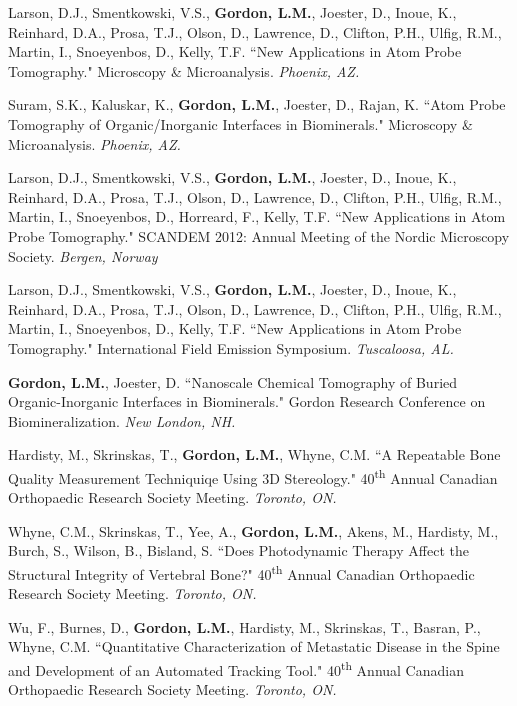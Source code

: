 Larson, D.J., Smentkowski, V.S., \textbf{Gordon, L.M.}, Joester, D., Inoue, K.,  Reinhard, D.A., Prosa, T.J., Olson, D., Lawrence, D., Clifton, P.H., Ulfig, R.M., Martin, I., Snoeyenbos, D., Kelly, T.F. ``New Applications in Atom Probe Tomography." Microscopy \& Microanalysis. \emph{Phoenix, AZ.}

Suram, S.K., Kaluskar, K., \textbf{Gordon, L.M.}, Joester, D., Rajan, K. ``Atom Probe Tomography of Organic/Inorganic Interfaces in Biominerals." Microscopy \& Microanalysis. \emph{Phoenix, AZ.}

Larson, D.J., Smentkowski, V.S., \textbf{Gordon, L.M.}, Joester, D., Inoue, K.,  Reinhard, D.A., Prosa, T.J., Olson, D., Lawrence, D., Clifton, P.H., Ulfig, R.M., Martin, I., Snoeyenbos, D., Horreard, F., Kelly, T.F. ``New Applications in Atom Probe Tomography." SCANDEM 2012: Annual Meeting of the Nordic Microscopy Society. \emph{Bergen, Norway}

Larson, D.J., Smentkowski, V.S., \textbf{Gordon, L.M.}, Joester, D., Inoue, K.,  Reinhard, D.A., Prosa, T.J., Olson, D., Lawrence, D., Clifton, P.H., Ulfig, R.M., Martin, I., Snoeyenbos, D.,  Kelly, T.F. ``New Applications in Atom Probe Tomography." International Field Emission Symposium. \emph{Tuscaloosa, AL.}

\textbf{Gordon, L.M.}, Joester, D. ``Nanoscale Chemical Tomography of Buried Organic-Inorganic Interfaces in Biominerals." Gordon Research Conference on Biomineralization. \emph{New London, NH.}

Hardisty, M., Skrinskas, T., \textbf{Gordon, L.M.}, Whyne, C.M. ``A Repeatable Bone Quality Measurement Techniquiqe Using 3D Stereology." 40\textsuperscript{th} Annual Canadian Orthopaedic Research Society Meeting. \emph{Toronto, ON.}

Whyne, C.M., Skrinskas, T., Yee, A., \textbf{Gordon, L.M.}, Akens, M., Hardisty, M., Burch, S., Wilson, B., Bisland, S. ``Does Photodynamic Therapy Affect the Structural Integrity of Vertebral Bone?" 40\textsuperscript{th} Annual Canadian Orthopaedic Research Society  Meeting. \emph{Toronto, ON.}

Wu, F., Burnes, D., \textbf{Gordon, L.M.}, Hardisty, M., Skrinskas, T., Basran, P., Whyne, C.M. ``Quantitative Characterization of Metastatic Disease in the Spine and Development of an Automated Tracking Tool." 40\textsuperscript{th} Annual Canadian Orthopaedic Research Society Meeting. \emph{Toronto, ON.}

